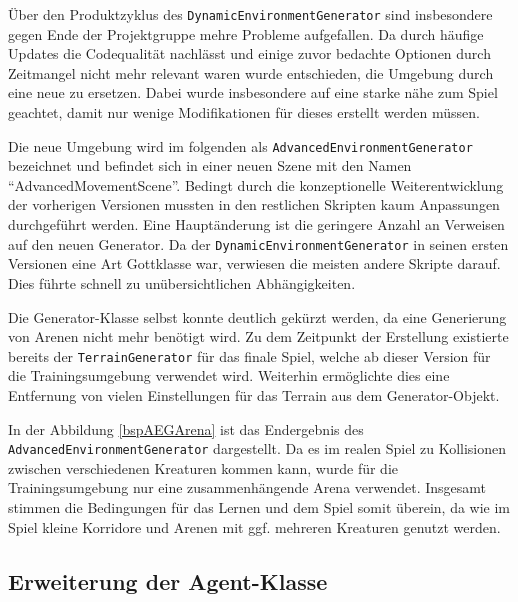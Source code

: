 Über den Produktzyklus des \texttt{DynamicEnvironmentGenerator} sind insbesondere gegen Ende der Projektgruppe mehre Probleme aufgefallen. Da durch häufige Updates die Codequalität nachlässt und einige zuvor bedachte Optionen durch Zeitmangel nicht mehr relevant waren wurde entschieden, die Umgebung durch eine neue zu ersetzen. Dabei wurde insbesondere auf eine starke nähe zum Spiel geachtet, damit nur wenige Modifikationen für dieses erstellt werden müssen.
\begin{sloppypar}
Die neue Umgebung wird im folgenden als \texttt{Advanced\-Environment\-Generator} bezeichnet und befindet sich in einer neuen Szene mit den Namen \enquote{AdvancedMovementScene}. Bedingt durch die konzeptionelle Weiterentwicklung der vorherigen Versionen mussten in den restlichen Skripten kaum Anpassungen durchgeführt werden. Eine Hauptänderung ist die geringere Anzahl an Verweisen auf den neuen Generator. Da der \texttt{DynamicEnvironmentGenerator} in seinen ersten Versionen eine Art Gottklasse war, verwiesen die meisten andere Skripte darauf. Dies führte schnell zu unübersichtlichen Abhängigkeiten.
\end{sloppypar}
Die Generator-Klasse selbst konnte deutlich gekürzt werden, da eine Generierung von Arenen nicht mehr benötigt wird. Zu dem Zeitpunkt der Erstellung existierte bereits der \texttt{TerrainGenerator} für das finale Spiel, welche ab dieser Version für die Trainingsumgebung verwendet wird. Weiterhin ermöglichte dies eine Entfernung von vielen Einstellungen für das Terrain aus dem Generator-Objekt.

In der Abbildung \ref{bspAEGArena} ist das Endergebnis des \texttt{Advanced\-Environment\-Generator} dargestellt. Da es im realen Spiel zu Kollisionen zwischen verschiedenen Kreaturen kommen kann, wurde für die Trainingsumgebung nur eine zusammenhängende Arena verwendet. Insgesamt stimmen die Bedingungen für das Lernen und dem Spiel somit überein, da wie im Spiel kleine Korridore und Arenen mit ggf. mehreren Kreaturen genutzt werden.
\subsection{Erweiterung der Agent-Klasse}

